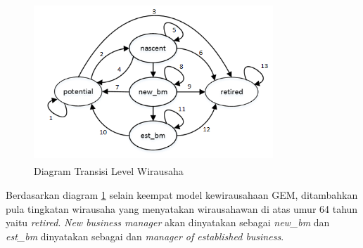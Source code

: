 	\begin{figure} [H]
		\centering  
		\includegraphics[width=9cm, height=6cm]{tingkatwirausaha} 
		\caption[Diagram Transisi Level Wirausaha]{Diagram Transisi Level Wirausaha} 
		\label{fig:tingkatwirausaha} 
	\end{figure}
Berdasarkan diagram \ref{fig:tingkatwirausaha} selain keempat model kewirausahaan GEM, ditambahkan pula tingkatan wirausaha yang menyatakan wirausahawan di atas umur 64 tahun yaitu \textit{retired}. \textit{New business manager} akan dinyatakan sebagai \textit{new\_bm} dan \textit{est\_bm} dinyatakan sebagai  dan \textit{manager of established business}.



	
	




